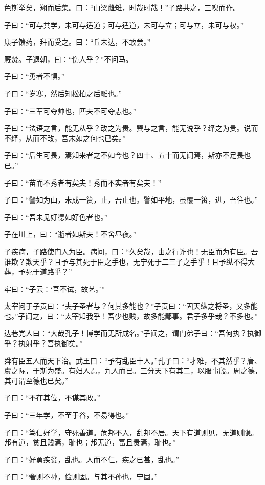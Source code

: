 \documentclass[a5paper]{ctexbook}
\begin{document}
    色斯举矣，翔而后集。曰：“山梁雌雉，时哉时哉！”子路共之，三嗅而作。

    子曰：“可与共学，未可与适道；可与适道，未可与立；可与立，未可与权。”

    康子馈药，拜而受之。曰：“丘未达，不敢尝。”
    
    厩焚。子退朝，曰：“伤人乎？”不问马。

    子曰：“勇者不惧。”

    子曰：“岁寒，然后知松柏之后雕也。”

    子曰：“三军可夺帅也，匹夫不可夺志也。”

    子曰：“法语之言，能无从乎？改之为贵。巽与之言，能无说乎？绎之为贵。说而不绎，从而不改，吾末如之何也已矣。”

    子曰：“后生可畏，焉知来者之不如今也？四十、五十而无闻焉，斯亦不足畏也已。”

    子曰：“苗而不秀者有矣夫！秀而不实者有矣夫！”

    子曰：“譬如为山，未成一篑，止，吾止也。譬如平地，虽覆一篑，进，吾往也。”

    子曰：“吾未见好德如好色者也。”

    子在川上，曰：“逝者如斯夫！不舍昼夜。”

    子疾病，子路使门人为臣。病间，曰：“久矣哉，由之行诈也！无臣而为有臣。吾谁欺？欺天乎？且予与其死于臣之手也，无宁死于二三子之手乎！且予纵不得大葬，予死于道路乎？”

    牢曰：“子云：‘吾不试，故艺。’”

    太宰问于子贡曰：“夫子圣者与？何其多能也？”子贡曰：“固天纵之将圣，又多能也。”子闻之，曰：“太宰知我乎！吾少也贱，故多能鄙事。君子多乎哉？不多也。”

    达巷党人曰：“大哉孔子！博学而无所成名。”子闻之，谓门弟子曰：“吾何执？执御乎？执射乎？吾执御矣。”

    舜有臣五人而天下治。武王曰：“予有乱臣十人。”孔子曰：“才难，不其然乎？唐、虞之际，于斯为盛。有妇人焉，九人而已。三分天下有其二，以服事殷。周之德，其可谓至德也已矣。”

    子曰：“不在其位，不谋其政。”

    子曰：“三年学，不至于谷，不易得也。”

    子曰：“笃信好学，守死善道。危邦不入，乱邦不居。天下有道则见，无道则隐。邦有道，贫且贱焉，耻也；邦无道，富且贵焉，耻也。”

    子曰：“好勇疾贫，乱也。人而不仁，疾之已甚，乱也。”

    子曰：“奢则不孙，俭则固。与其不孙也，宁固。”
\end{document}
